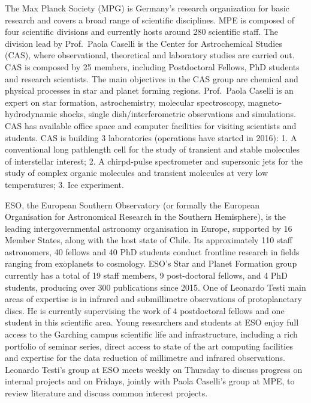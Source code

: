 \documentclass[10pt,fleqn,twoside]{article}
\begin{document}
The Max Planck Society (MPG) is Germany's research organization for basic research and
covers a broad range of scientific disciplines.  MPE is composed of four scientific divisions and currently hosts around 280 scientific staff. The division lead by Prof.~Paola Caselli is the Center for Astrochemical Studies (CAS), where observational,
theoretical and laboratory studies are carried out. CAS is composed by 25 members,
including Postdoctoral Fellows, PhD students and research scientists. The main objectives in
the CAS group are chemical and physical processes in star and planet forming regions.  Prof.~Paola Caselli is an expert on star formation, astrochemistry, molecular
spectroscopy, magneto-hydrodynamic shocks, single dish/interferometric observations and
simulations.
CAS has available office space and computer facilities for visiting scientists and students.
CAS is building 3 laboratories (operations have started in 2016): 1. A conventional long pathlength cell for the study of
transient and stable molecules of interstellar interest; 2. A
chirpd-pulse spectrometer and supersonic jets for the study of complex organic molecules and transient molecules at very
low temperatures; 3. Ice experiment.

 ESO, the European Southern Observatory (or formally the European Organisation for Astronomical Research in the Southern Hemisphere), is the leading intergovernmental astronomy organisation in Europe, supported by 16 Member States, along with the host state of Chile. Its approximately 110 staff astronomers, 40 fellows and 40 PhD students conduct frontline research in fields ranging from exoplanets to cosmology. ESO’s Star and Planet Formation group currently has a total of 19 staff members, 9 post-doctoral fellows, and 4 PhD students, producing over 300 publications since 2015. One of Leonardo Testi main areas of expertise is in infrared and submillimetre observations of protoplanetary discs. He is currently supervising the work of 4 postdoctoral fellows and one student in this scientific area. Young researchers and students at ESO enjoy full access to the Garching campus scientific life and infrastructure, including a rich portfolio of seminar series, direct access to state of the art computing facilities and expertise for the data reduction of millimetre and infrared observations. Leonardo Testi’s group at ESO meets weekly on Thursday to discuss progress on internal projects and on Fridays, jointly with Paola Caselli’s group at MPE, to review literature and discuss common interest projects.
\end{document}
